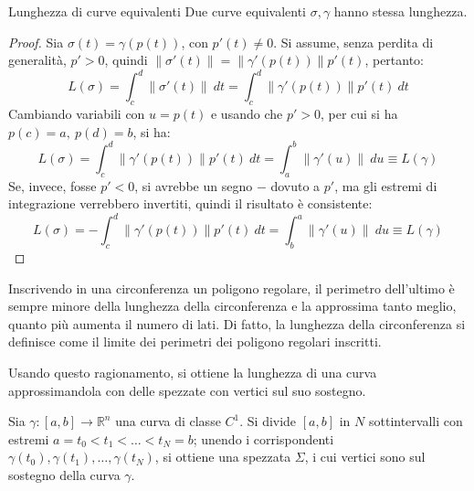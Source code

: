 \documentclass[11pt, a4paper]{scrartcl}
\theoremstyle{definition}
\numberwithin{esempio}{section}
\theoremstyle{definition}
\numberwithin{obs}{section}
\numberwithin{nota}{section}
\numberwithin{equation}{subsection}
\begin{document}
\begin{teorema}
	{Lunghezza di curve equivalenti}{}
	Due curve equivalenti $\sigma , \gamma$ hanno stessa lunghezza.
	\begin{proof}
		Sia $\sigma (t) = \gamma(p(t))$, con $p'(t) \neq 0 $. 
		Si assume, senza perdita di generalit\`a, $p'>0$, quindi $\left\lVert \sigma '(t) \right\rVert = \left\lVert \gamma'(p(t)) \right\rVert p'(t)$, pertanto:
\[
L (\sigma ) = \int_{c} ^d \left\lVert \sigma '(t) \right\rVert \ dt = \int_{c} ^d \left\lVert \gamma '(p(t)) \right\rVert p'(t) \ dt 
\] 
Cambiando variabili con $ u = p(t)$ e usando che $p'>0$, per cui si ha $p(c) = a , \ p(d)= b  $, si ha:
\[
L(\sigma ) = \int_{c} ^d \left\lVert \gamma'(p(t))  \right\rVert p'(t) \ dt = \int_{a} ^b \left\lVert \gamma' (u)\right\rVert  \ du \equiv L(\gamma)
\] 
Se, invece, fosse $p'<0$, si avrebbe un segno $-$ dovuto a $p'$, ma gli estremi di integrazione verrebbero invertiti, quindi il risultato \`e consistente:
\[
	L(\sigma ) = - \int_{c} ^d \left\lVert \gamma'(p(t)) \right\rVert p'(t) \ dt = \int_{b} ^a \left\lVert \gamma'(u)  \right\rVert  \ du \equiv L(\gamma)
\] 
	\end{proof}
\end{teorema}
Inscrivendo in una circonferenza un poligono regolare, il perimetro dell'ultimo \`e sempre minore della lunghezza della circonferenza e la approssima tanto meglio, quanto pi\`u aumenta il numero di lati. 
Di fatto, la lunghezza della circonferenza si definisce come il limite dei perimetri dei poligono regolari inscritti.

Usando questo ragionamento, si ottiene la lunghezza di una curva approssimandola con delle spezzate con vertici sul suo sostegno.

Sia $\gamma : \left[ a,b \right] \to \mathbb{R}^n$ una curva di classe $C^1$. 
Si divide $\left[ a,b \right] $ in $N$ sottintervalli con estremi $a= t_0 < t_1< \ldots< t_N = b$;
unendo i corrispondenti $\gamma(t_0), \gamma(t_1), \ldots, \gamma(t_N)$, si ottiene una spezzata $\Sigma$, i cui vertici sono sul sostegno della curva $\gamma$.
\end{document}
